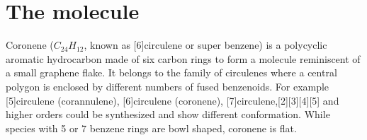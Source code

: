 \label{section:HBBNC}
\label{section:HBC}

\section{The molecule}
Coronene ($C_{24}H_{12}$, known as [6]circulene or super benzene) is a polycyclic aromatic hydrocarbon made of six carbon rings to form a molecule reminiscent of a small graphene flake. It belongs to the family of circulenes where a central polygon is enclosed by different numbers of fused benzenoids. For example [5]circulene (corannulene), [6]circulene (coronene), [7]circulene,[2][3][4][5] and higher orders could be synthesized and show different conformation. While species with 5 or 7 benzene rings are bowl shaped, coronene is flat.

